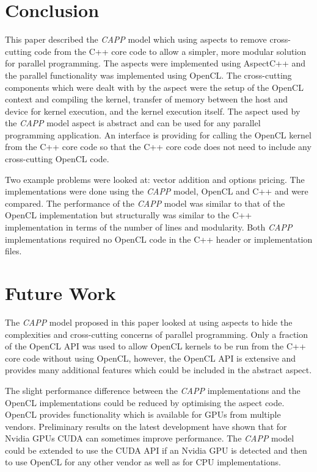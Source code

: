 \documentclass{sig-alternate-05-2015}
\begin{document}
\section{Conclusion}\label{sec:conclusion}

This paper described the \textit{CAPP} model which using aspects to remove
cross-cutting code from the C++ core code to allow a simpler, more modular
solution for parallel programming. The aspects were implemented using AspectC++
and the parallel functionality was implemented using OpenCL. The cross-cutting 
components which were dealt with by the aspect were the setup of the OpenCL
context and compiling the kernel, transfer of memory between the host and device
for kernel execution, and the kernel execution itself. The aspect used by the
\textit{CAPP} model aspect is abstract and can be used for any parallel programming
application. An interface is providing for calling the OpenCL kernel from the
C++ core code so that the C++ core code does not need to include any
cross-cutting OpenCL code.

Two example problems were looked at: vector addition and options pricing. The
implementations were done using the \textit{CAPP} model, OpenCL and C++ and were
compared. The performance of the \textit{CAPP} model was similar to that of the
OpenCL implementation but structurally was similar to the C++ implementation in
terms of the number of lines and modularity. Both \textit{CAPP} implementations
required no OpenCL code in the C++ header or implementation files.

\section{Future Work}\label{sec:future}

The \textit{CAPP} model proposed in this paper looked at using aspects to hide
the complexities and cross-cutting concerns of parallel programming. Only a
fraction of the OpenCL API was used to allow OpenCL kernels to be run from the
C++ core code without using OpenCL, however, the OpenCL API is extensive and
provides many additional features which could be included in the abstract
aspect.  

The slight performance difference between the \textit{CAPP} implementations and
the OpenCL implementations could be reduced by optimising the aspect code.
OpenCL provides functionality which is available for GPUs from multiple vendors.
Preliminary results on the latest development have shown that for Nvidia GPUs
CUDA can sometimes improve performance. The \textit{CAPP} model could be extended
to use the CUDA API if an Nvidia GPU is detected and then to use OpenCL for any
other vendor as well as for CPU implementations. 
\end{document}
